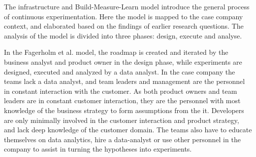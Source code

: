 \documentclass[english]{tktltiki2}
\theoremstyle{definition}
\theoremstyle{remark}
\begin{document}
The infrastructure and Build-Measure-Learn model \cite{fagerholm2014building} introduce the general process of continuous experimentation. Here the model is mapped to the case company context, and elaborated based on the findings of earlier research questions. The analysis of the model is divided into three phases: design, execute and analyse. 





In the Fagerholm et al. model, the roadmap is created and iterated by the business analyst and product owner in the design phase, while experiments are designed, executed and analyzed by a data analyst. In the case company the teams lack a data analyst, and team leaders and management are the personnel in constant interaction with the customer. As both product owners and team leaders are in constant customer interaction, they are the personnel with most knowledge of the business strategy to form assumptions from the it. Developers are only minimally involved in the customer interaction and product strategy, and lack deep knowledge of the customer domain. The teams also have to educate themselves on data analytics, hire a data-analyst or use other personnel in the company to assist in turning the hypotheses into experiments. 
\end{document}
